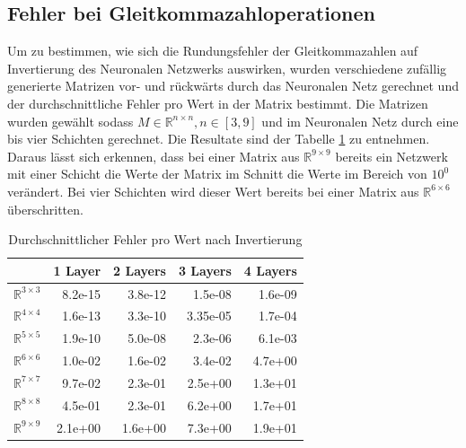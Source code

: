 \documentclass[Interploate_hadwritten_Digits.tex]{subfiles}
\begin{document}
	\subsection{Fehler bei Gleitkommazahloperationen}
	\label{sec:results_error_inverse}
	Um zu bestimmen, wie sich die Rundungsfehler der Gleitkommazahlen auf Invertierung des Neuronalen Netzwerks auswirken, wurden verschiedene zufällig generierte Matrizen vor- und rückwärts durch das Neuronalen Netz gerechnet und der durchschnittliche Fehler pro Wert in der Matrix bestimmt. Die Matrizen wurden gewählt sodass $ M \in \mathbb{R}^{n \times n}, n \in [3, 9] $ und im Neuronalen Netz durch eine bis vier Schichten gerechnet. Die Resultate sind der Tabelle \ref{tbl:reverse_error} zu entnehmen. Daraus lässt sich erkennen, dass bei einer Matrix aus $ \mathbb{R}^{9 \times 9} $ bereits ein Netzwerk mit einer Schicht die Werte der Matrix im Schnitt die Werte im Bereich von $ 10^{0} $ verändert. Bei vier Schichten wird dieser Wert bereits bei einer Matrix aus $ \mathbb{R}^{6 \times 6} $ überschritten.
	\begin{table}[H]
		\centering
		\begin{tabular}{|l|r|r|r|r|}
			\hline
			 & 1 Layer & 2 Layers & 3 Layers & 4 Layers  \\ \hline
			$ \mathbb{R}^{3 \times 3} $ & 8.2e-15 & 3.8e-12 & 1.5e-08 & 1.6e-09 \\ \hline
			$ \mathbb{R}^{4 \times 4} $ & 1.6e-13 & 3.3e-10 & 3.35e-05 & 1.7e-04 \\ \hline
			$ \mathbb{R}^{5 \times 5} $ & 1.9e-10 & 5.0e-08 & 2.3e-06 & 6.1e-03 \\ \hline
			$ \mathbb{R}^{6 \times 6} $ & 1.0e-02 & 1.6e-02 & 3.4e-02 & 4.7e+00 \\ \hline
			$ \mathbb{R}^{7 \times 7} $ & 9.7e-02 & 2.3e-01 & 2.5e+00 & 1.3e+01 \\ \hline
			$ \mathbb{R}^{8 \times 8} $ & 4.5e-01 & 2.3e-01 & 6.2e+00 & 1.7e+01 \\ \hline
			$ \mathbb{R}^{9 \times 9} $ & 2.1e+00 & 1.6e+00 & 7.3e+00 & 1.9e+01 \\ \hline
		\end{tabular}
		\caption{Durchschnittlicher Fehler pro Wert nach Invertierung}
		\label{tbl:reverse_error}
	\end{table}	
	
\end{document}
